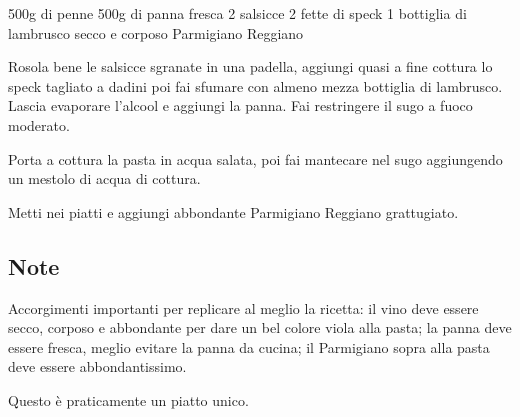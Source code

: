 \begin{ingreds}
	500g di penne 
	500g di panna fresca 
	2 salsicce 
	2 fette di speck 
	1 bottiglia di lambrusco secco e corposo 
	Parmigiano Reggiano 

\end{ingreds}

\begin{method}
Rosola bene le salsicce sgranate in una padella, aggiungi quasi a fine cottura lo speck tagliato a dadini poi fai sfumare con almeno mezza bottiglia di lambrusco. Lascia evaporare l'alcool e aggiungi la panna. Fai restringere il sugo a fuoco moderato.

Porta a cottura la pasta in acqua salata, poi fai mantecare nel sugo aggiungendo un mestolo di acqua di cottura.

Metti nei piatti e aggiungi abbondante Parmigiano Reggiano grattugiato.

\end{method}
\subsection*{Note}
	Accorgimenti importanti per replicare al meglio la ricetta: il vino deve essere secco, corposo e abbondante per dare un bel colore viola alla pasta; la panna deve essere fresca, meglio evitare la panna da cucina; il Parmigiano sopra alla pasta deve essere abbondantissimo.

	Questo è praticamente un piatto unico.


